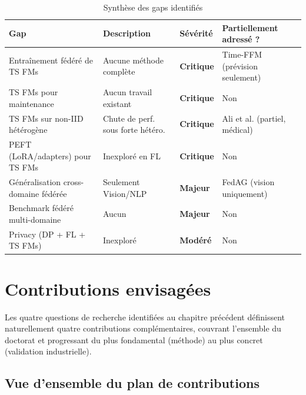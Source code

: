 \documentclass[12pt, a4paper]{report}
\begin{document}
\begin{table}[h!]
\centering
\caption{Synthèse des gaps identifiés}
\label{tab:gaps}
\renewcommand{\arraystretch}{1.6}
\begin{tabularx}{\textwidth}{>{\raggedright\arraybackslash}p{4.5cm}X>{\centering\arraybackslash}p{2.2cm}>{\raggedright\arraybackslash}p{4cm}}
\toprule
\textbf{Gap} & \textbf{Description} & \textbf{Sévérité} & \textbf{Partiellement adressé ?} \\
\midrule
Entraînement fédéré de TS FMs & Aucune méthode complète & \textcolor{gapred}{\textbf{Critique}} & Time-FFM (prévision seulement) \\
TS FMs pour maintenance & Aucun travail existant & \textcolor{gapred}{\textbf{Critique}} & Non \\
TS FMs sur non-IID hétérogène & Chute de perf. sous forte hétéro. & \textcolor{gapred}{\textbf{Critique}} & Ali et al. (partiel, médical) \\
PEFT (LoRA/adapters) pour TS FMs & Inexploré en FL & \textcolor{gapred}{\textbf{Critique}} & Non \\
Généralisation cross-domaine fédérée & Seulement Vision/NLP & \textcolor{gaporange}{\textbf{Majeur}} & FedAG (vision uniquement) \\
Benchmark fédéré multi-domaine & Aucun & \textcolor{gaporange}{\textbf{Majeur}} & Non \\
Privacy (DP + FL + TS FMs) & Inexploré & \textcolor{gapyellow}{\textbf{Modéré}} & Non \\
\bottomrule
\end{tabularx}
\end{table}

\chapter{Contributions envisagées}

Les quatre questions de recherche identifiées au chapitre précédent définissent
naturellement quatre contributions complémentaires, couvrant l'ensemble du doctorat
et progressant du plus fondamental (méthode) au plus concret (validation industrielle).

\section{Vue d'ensemble du plan de contributions}
\end{document}
